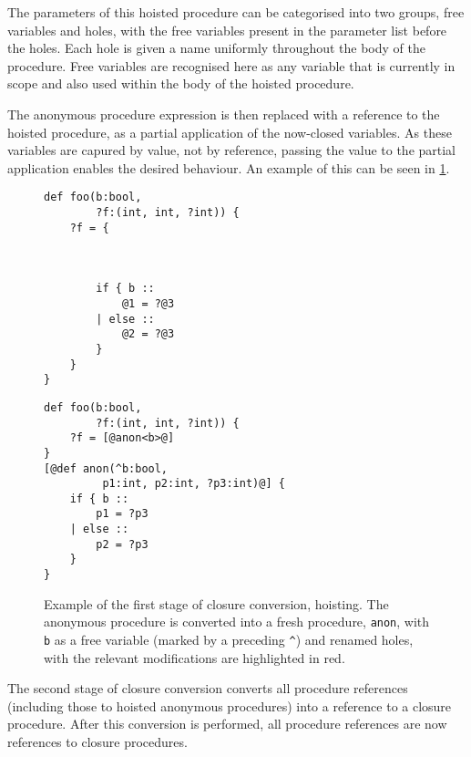 The parameters of this hoisted procedure can be categorised into two groups, free variables and holes, with the free variables present in the parameter list before the holes. Each hole is given a name uniformly throughout the body of the procedure. Free variables are recognised here as any variable that is currently in scope and also used within the body of the hoisted procedure. 

The anonymous procedure expression is then replaced with a reference to the hoisted procedure, as a partial application of the now-closed variables. As these variables are capured by value, not by reference, passing the value to the partial application enables the desired behaviour. An example of this can be seen in \cref{lst:closure-conversion-hoist}.

\begin{figure}[ht]
  \begin{minipage}[t]{.48\textwidth}
    \begin{lstlisting}
def foo(b:bool, 
        ?f:(int, int, ?int)) {
    ?f = { 



        if { b :: 
            @1 = ?@3 
        | else :: 
            @2 = ?@3
        } 
    }
}
\end{lstlisting}
  \end{minipage}\hfill
  \begin{minipage}[t]{.48\textwidth}
    \begin{lstlisting}[numbers=none]
def foo(b:bool, 
        ?f:(int, int, ?int)) {
    ?f = [@anon<b>@]
}
[@def anon(^b:bool, 
         p1:int, p2:int, ?p3:int)@] {
    if { b :: 
        p1 = ?p3 
    | else :: 
        p2 = ?p3
    } 
}
 \end{lstlisting}
  \end{minipage}
  \caption[Example of the first stage of closure conversion, hoisting.]{Example of the first stage of closure conversion, hoisting. The anonymous procedure is converted into a fresh procedure, \texttt{anon}, with \texttt{b} as a free variable (marked by a preceding \texttt{\^}) and renamed holes, with the relevant modifications are highlighted in \textcolor{rred}{red}.}
  \label{lst:closure-conversion-hoist}
\end{figure}

The second stage of closure conversion converts all procedure references (including those to hoisted anonymous procedures) into a reference to a closure procedure. After this conversion is performed, all procedure references are now references to closure procedures.

